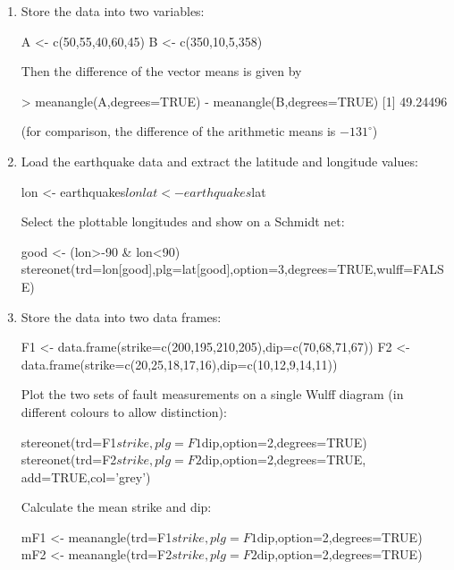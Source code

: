 \begin{enumerate}

\item Store the data into two variables:

\begin{script}
A <- c(50,55,40,60,45)
B <- c(350,10,5,358)
\end{script}

Then the difference of the vector means is given by

\begin{console}
> meanangle(A,degrees=TRUE) - meanangle(B,degrees=TRUE)
[1] 49.24496
\end{console}

(for comparison, the difference of the arithmetic means is
$-131^\circ$)

\item Load the earthquake data and extract the latitude and longitude
  values:

\begin{script}  
lon <- earthquakes$lon
lat <- earthquakes$lat
\end{script}

Select the plottable longitudes and show on a Schmidt net:

\begin{script}[firstnumber=3]
good <- (lon>-90 & lon<90)
stereonet(trd=lon[good],plg=lat[good],option=3,degrees=TRUE,wulff=FALSE)
\end{script}

\item Store the data into two data frames:

\begin{script}
F1 <- data.frame(strike=c(200,195,210,205),dip=c(70,68,71,67))
F2 <- data.frame(strike=c(20,25,18,17,16),dip=c(10,12,9,14,11))
\end{script}

Plot the two sets of fault measurements on a single Wulff diagram (in
different colours to allow distinction):

\begin{script}[firstnumber=3]
stereonet(trd=F1$strike,plg=F1$dip,option=2,degrees=TRUE)
stereonet(trd=F2$strike,plg=F2$dip,option=2,degrees=TRUE,
          add=TRUE,col='grey')
\end{script}

Calculate the mean strike and dip:

\begin{script}[firstnumber=6]
mF1 <- meanangle(trd=F1$strike,plg=F1$dip,option=2,degrees=TRUE)
mF2 <- meanangle(trd=F2$strike,plg=F2$dip,option=2,degrees=TRUE)
\end{script}


\end{enumerate}
